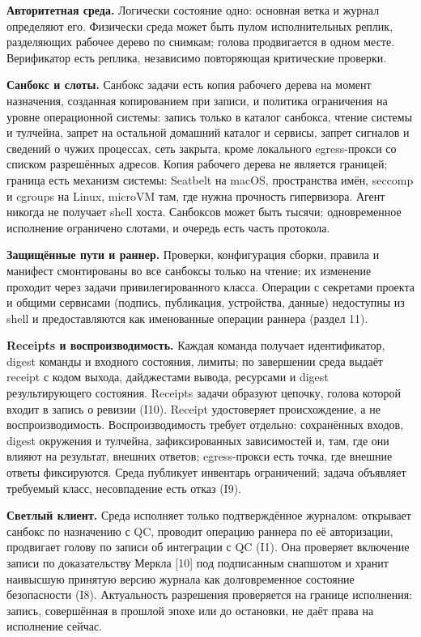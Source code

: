 \documentclass[11pt,a4paper]{article}
\begin{document}
\textbf{Авторитетная среда.} Логически состояние одно: основная ветка и журнал определяют его. Физически среда может быть пулом исполнительных реплик, разделяющих рабочее дерево по снимкам; голова продвигается в одном месте. Верификатор есть реплика, независимо повторяющая критические проверки.

\textbf{Санбокс и слоты.} Санбокс задачи есть копия рабочего дерева на момент назначения, созданная копированием при записи, и политика ограничения на уровне операционной системы: запись только в каталог санбокса, чтение системы и тулчейна, запрет на остальной домашний каталог и сервисы, запрет сигналов и сведений о чужих процессах, сеть закрыта, кроме локального egress-прокси со списком разрешённых адресов. Копия рабочего дерева не является границей; граница есть механизм системы: Seatbelt на macOS, пространства имён, seccomp и cgroups на Linux, microVM там, где нужна прочность гипервизора. Агент никогда не получает shell хоста. Санбоксов может быть тысячи; одновременное исполнение ограничено слотами, и очередь есть часть протокола.

\textbf{Защищённые пути и раннер.} Проверки, конфигурация сборки, правила и манифест смонтированы во все санбоксы только на чтение; их изменение проходит через задачи привилегированного класса. Операции с секретами проекта и общими сервисами (подпись, публикация, устройства, данные) недоступны из shell и предоставляются как именованные операции раннера (раздел 11).

\textbf{Receipts и воспроизводимость.} Каждая команда получает идентификатор, digest команды и входного состояния, лимиты; по завершении среда выдаёт receipt с кодом выхода, дайджестами вывода, ресурсами и digest результирующего состояния. Receipts задачи образуют цепочку, голова которой входит в запись о ревизии (I10). Receipt удостоверяет происхождение, а не воспроизводимость. Воспроизводимость требует отдельно: сохранённых входов, digest окружения и тулчейна, зафиксированных зависимостей и, там, где они влияют на результат, внешних ответов; egress-прокси есть точка, где внешние ответы фиксируются. Среда публикует инвентарь ограничений; задача объявляет требуемый класс, несовпадение есть отказ (I9).

\textbf{Светлый клиент.} Среда исполняет только подтверждённое журналом: открывает санбокс по назначению с QC, проводит операцию раннера по её авторизации, продвигает голову по записи об интеграции с QC (I1). Она проверяет включение записи по доказательству Меркла [10] под подписанным снапшотом и хранит наивысшую принятую версию журнала как долговременное состояние безопасности (I8). Актуальность разрешения проверяется на границе исполнения: запись, совершённая в прошлой эпохе или до остановки, не даёт права на исполнение сейчас.
\end{document}
